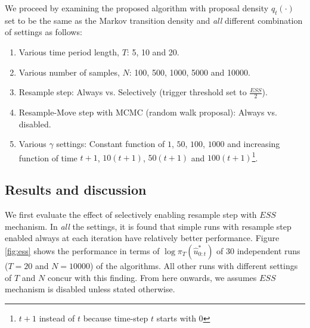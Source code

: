 We proceed by examining the proposed algorithm with proposal density $q_t(\cdot)$ set to be the same as the Markov transition density and \emph{all} different combination of settings as follows:
\begin{enumerate}
\item Various time period length, $T$: 5, 10 and 20.
\item Various number of samples, $N$: 100, 500, 1000, 5000 and 10000.
\item Resample step: Always vs. Selectively (trigger threshold set to $\frac{ESS}{2}$).
\item Resample-Move step with MCMC (random walk proposal): Always vs. disabled.
\item Various $\gamma$ settings: Constant function of $1$, $50$, $100$, $1000$ and increasing function of time $t+1$, $10(t+1)$, $50(t+1)$ and $100(t+1)$\footnote{$t+1$ instead of $t$ because time-step $t$ starts with 0}. 
\end{enumerate}

\subsection{Results and discussion}
We first evaluate the effect of selectively enabling resample step with $ESS$ mechanism. In \emph{all} the settings, it is found that simple runs with resample step enabled always at each iteration have relatively better performance. Figure \ref{fig:ess} shows the performance in terms of $\log\pi_T(\hat{u}^*_{0:t})$ of 30 independent runs ($T=20$ and $N=10000$) of the algorithms. All other runs with different settings of $T$ and $N$ concur with this finding. From here onwards, we assumes $ESS$ mechanism is disabled unless stated otherwise.

